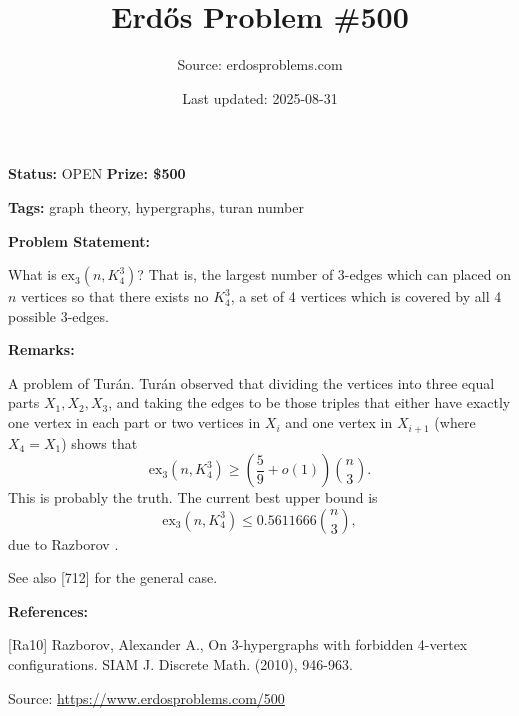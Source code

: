 \documentclass{article}
\title{Erd\H{o}s Problem \#500}
\date{Last updated: 2025-08-31}
\author{Source: erdosproblems.com}
\begin{document}
\maketitle

\noindent\textbf{Status:} OPEN \quad \textbf{Prize: \$500}

\noindent\textbf{Tags:} graph theory, hypergraphs, turan number

\medskip
\noindent\textbf{Problem Statement:}

What is $\mathrm{ex}_3(n,K_4^3)$? That is, the largest number of $3$-edges which can placed on $n$ vertices so that there exists no $K_4^3$, a set of 4 vertices which is covered by all 4 possible $3$-edges.

\bigskip
\noindent\textbf{Remarks:}

A problem of Tur\'{a}n. Tur\'{a}n observed that dividing the vertices into three equal parts $X_1,X_2,X_3$, and taking the edges to be those triples that either have exactly one vertex in each part or two vertices in $X_i$ and one vertex in $X_{i+1}$ (where $X_4=X_1$) shows that\[\mathrm{ex}_3(n,K_4^3)\geq\left(\frac{5}{9}+o(1)\right)\binom{n}{3}.\]This is probably the truth. The current best upper bound is\[\mathrm{ex}_3(n,K_4^3)\leq 0.5611666\binom{n}{3},\]due to Razborov \cite{Ra10}.

See also [712] for the general case.

\bigskip
\noindent\textbf{References:}

[Ra10] Razborov, Alexander A., On 3-hypergraphs with forbidden 4-vertex configurations. SIAM J. Discrete Math. (2010), 946-963.

\bigskip
\noindent\small{Source: \url{https://www.erdosproblems.com/500}}
\end{document}
